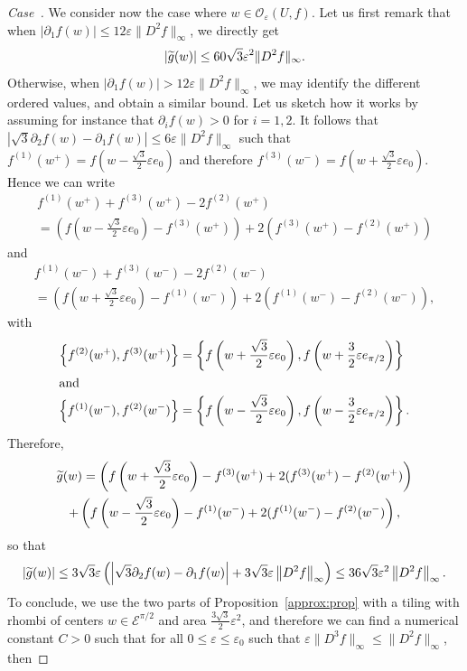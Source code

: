 \documentclass[AHL,Unicode,longabstracts,published]{cedram}
\newcommand{\eps}{\varepsilon}
\newcommand{\calE}{\mathcal{E}}
\newcommand{\calO}{\mathcal{O}}
\newcounter{casecount}
\newenvironment{lastcase}{\refstepcounter{casecount}\begin{proof}[Case~\thecasecount]}{\end{proof}}
\let\oldtilde\tilde
\renewcommand*{\tilde}[1]{\mathchoice{\widetilde{#1}}{\widetilde{#1}}{\oldtilde{#1}}{\oldtilde{#1}}}
\begin{document}
\begin{lastcase}
We consider now the case where $w\in {\calO}_\eps (U,f)$. Let us first remark that when $|\partial_1f(w)|\le 12\eps \|D^2f\|_\infty$, we directly get
\[
|\tilde{g}(w)| \le 60\sqrt{3}\eps^2 \|D^2f\|_\infty.
\]
Otherwise, when $|\partial_1f(w)|>12\eps \|D^2f\|_\infty$, we may identify the different ordered values, and obtain a similar bound. Let us sketch how it works by assuming for instance that $\partial_if(w)>0$ for $i=1,2$. It follows that $|\sqrt{3}\partial_2f(w)-\partial_1f(w)|\le 6\eps \|D^2f\|_\infty$ such that $f^{(1)}(w^+)=f(w-\tfrac{\sqrt{3}}{2}\eps e_0)$ and therefore $f^{(3)}(w^-)=f(w+\tfrac{\sqrt{3}}{2}\eps e_0)$. Hence we can write
\begin{multline*}
f^{(1)}(w^+)+f^{(3)}(w^+)-2f^{(2)}(w^+)\\
=\left(f\left(w-\frac{\sqrt{3}}{2}\eps e_0\right)-f^{(3)}(w^+)\right)+2\left(f^{(3)}(w^+)-f^{(2)}(w^+)\right)
\end{multline*}
and
\begin{multline*}
f^{(1)}(w^-)+f^{(3)}(w^-)-2f^{(2)}(w^-)\\
=\left(f\left(w+\frac{\sqrt{3}}{2}\eps e_0\right)-f^{(1)}(w^-)\right)+2\left(f^{(1)}(w^-)-f^{(2)}(w^-)\right),
\end{multline*}
with
\begin{align*}
\left\{f^{(2)}(w^+),f^{(3)}(w^+)\right\}&=\left\{f\left(w+\frac{\sqrt{3}}{2}\eps e_0\right),f\left(w+\frac{3}{2}\eps e_{\pi/2}\right)\right\}\\
\intertext{and}
\left\{f^{(1)}(w^-),f^{(2)}(w^-)\right\}&=\left\{f\left(w-\frac{\sqrt{3}}{2}\eps e_0\right),f\left(w-\frac{3}{2}\eps e_{\pi/2}\right)\right\}.
\end{align*}
Therefore,
\begin{multline*}
\tilde{g}(w) = \left(f\left(w+\frac{\sqrt{3}}{2}\eps e_0\right)-f^{(3)}(w^+)+2(f^{(3)}(w^+)-f^{(2)}(w^+)\right) \\
 + \left(f\left(w-\frac{\sqrt{3}}{2}\eps e_0\right)-f^{(1)}(w^-)+2(f^{(1)}(w^-)-f^{(2)}(w^-)\right),
\end{multline*}
so that
\[
\left|\tilde{g}(w) \right| \le 3\sqrt{3}\eps\left(\left|\sqrt{3}\partial_2f(w)-\partial_1f(w)\right|+3\sqrt{3}\eps \left\|D^2f\right\|_\infty\right)\le 36\sqrt{3}\eps^2 \left\|D^2f\right\|_\infty.
\]
To conclude, we use the two parts of Proposition~\ref{approx:prop} with a tiling with rhombi of centers $w\in {\calE}^{\pi/2}$ and area $\tfrac{3\sqrt{3}}{2}\eps^2$, and therefore we can find a numerical constant $C>0$ such that for all $0\leq \eps\leq\eps_0$ such that $\eps\|D^3f\|_\infty\le \|D^2f\|_\infty$, then

\end{lastcase}
\end{document}
